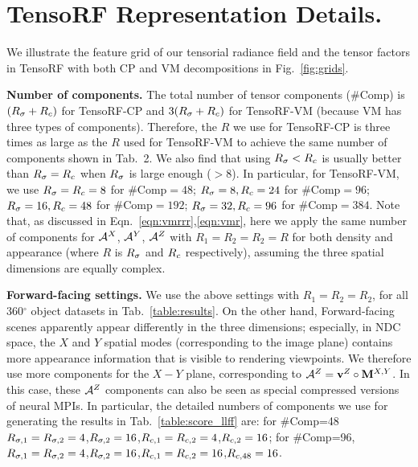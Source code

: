 \documentclass[runningheads]{llncs}
\newcommand{\boldstartspace}[1]{\vspace{0.1in}\noindent\textbf{#1}}
\begin{document}
 


%
 




\appendix
\clearpage{}





\renewcommand{\gold}[1]{\colorbox{bronze}{{#1}}}
\renewcommand{\gold}[1]{\textbf{#1}}

\section{TensoRF Representation Details.}
We illustrate the feature grid of our tensorial radiance field and the tensor factors in TensoRF with both CP and VM decompositions in Fig.~\ref{fig:grids}.

\boldstartspace{Number of components.}
The total number of tensor components ($\#$Comp) is $(R_\sigma+R_c)$ for TensoRF-CP and $3(R_\sigma+R_c)$ for TensoRF-VM (because VM has three types of components). Therefore, the $R$ we use for TensoRF-CP is three times as large as the $R$ used for TensoRF-VM to achieve the same number of components shown in Tab.~2.
We also find that using $R_\sigma<R_c$ is usually better than $R_\sigma=R_c$ when $R_\sigma$ is large enough ($>8$).
In particular, for TensoRF-VM, we use $R_\sigma=R_c=8$ for $\#\text{Comp}=48$; $R_\sigma=8, R_c=24$ for $\#\text{Comp}=96$; $R_\sigma=16,R_c=48$ for $\#\text{Comp}=192$; $R_\sigma=32,R_c=96$ for $\#\text{Comp}=384$. Note that, as discussed in Eqn.~\ref{eqn:vmrrr},\ref{eqn:vmr}, here we apply the same number of components for $\mathcal{A}^X$, $\mathcal{A}^Y$, $\mathcal{A}^Z$ with $R_1=R_2=R_2=R$ for both density and appearance (where $R$ is $R_\sigma$ and $R_c$ respectively), assuming the three spatial dimensions are equally complex.

\boldstartspace{Forward-facing settings.}
We use the above settings with $R_1=R_2=R_2$, for all 360$^\circ$ object datasets in Tab.~\ref{table:results}.  On the other hand, Forward-facing scenes apparently appear differently in the three dimensions; especially, in NDC space, the $X$ and $Y$ spatial modes (corresponding to the image plane) contains more appearance information that is visible to rendering viewpoints. We therefore use more components for the $X-Y$ plane, corresponding to $\mathcal{A}^Z=\mathbf{v}^Z \circ \mathbf{M}^{X,Y}$. In this case, these $\mathcal{A}^Z$ components can also be seen as special compressed versions of neural MPIs. In particular, the detailed numbers of components we use for generating the results in Tab.~\ref{table:score_llff} are: for $\#$Comp=48 $R_{\sigma,1}=R_{\sigma,2}=4$,$R_{\sigma,2}=16$,$R_{c,1}=R_{c,2}=4$,$R_{c,2}=16$; for $\#$Comp=96, $R_{\sigma,1}=R_{\sigma,2}=4$,$R_{\sigma,2}=16$,$R_{c,1}=R_{c,2}=16$,$R_{c,48}=16$.
\end{document}
